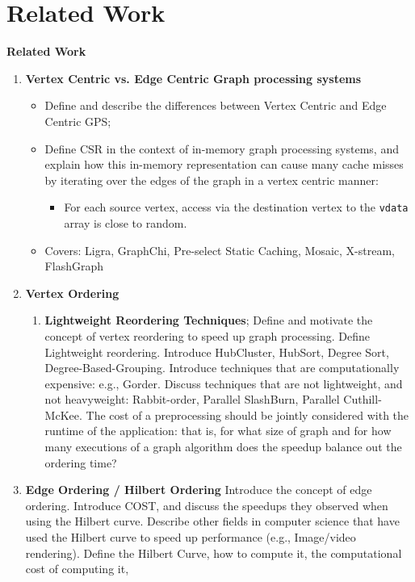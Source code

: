 
\chapter{Related Work}
\label{ch:relatedwork}
\textbf{Related Work}
    \begin{enumerate}[label*=\arabic*.]
      \item {\textbf{Vertex Centric vs. Edge Centric Graph processing systems}}
      \begin{itemize}
        \item Define and describe the differences between Vertex Centric and Edge Centric GPS;
        \item Define CSR in the context of in-memory graph processing systems, and explain how this in-memory representation can cause many cache misses by iterating over the edges of the graph in a 
        vertex centric manner: 
        \begin{itemize}
          \item For each source vertex, access via the destination vertex to the \texttt{vdata} array is close to random.
        \end{itemize}
        \item Covers: Ligra, GraphChi, Pre-select Static Caching, Mosaic, X-stream, FlashGraph
      \end{itemize}
      \item{\textbf{Vertex Ordering}
      \begin{enumerate}[label*=\arabic*.]
        \item{\textbf{Lightweight Reordering Techniques}; Define and motivate the concept of vertex reordering to speed up graph processing. Define Lightweight reordering.  
        Introduce HubCluster, HubSort, Degree Sort, Degree-Based-Grouping. Introduce techniques that are computationally expensive: e.g., Gorder. Discuss techniques that are 
        not lightweight, and not heavyweight: Rabbit-order, Parallel SlashBurn, Parallel Cuthill-McKee. The cost of a preprocessing should be jointly considered with the runtime of the application: that is, for what size of graph and for how many executions of a graph algorithm does the speedup balance out the ordering time?}
      \end{enumerate}
      }
      \item{\textbf{Edge Ordering / Hilbert Ordering}
        Introduce the concept of edge ordering. Introduce COST, and discuss the speedups they observed when using the Hilbert curve. Describe other fields in computer science that have used the Hilbert curve to speed up performance (e.g., Image/video rendering). Define the Hilbert Curve, how to compute it, the computational cost of computing it, 
}
\end{enumerate}
